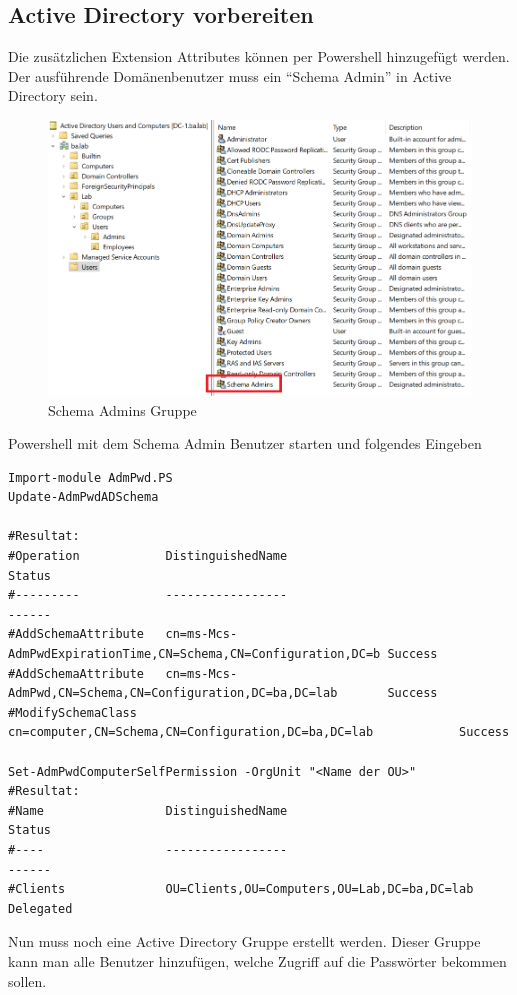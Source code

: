 \subsection{Active Directory vorbereiten}
Die zusätzlichen Extension Attributes können per Powershell hinzugefügt werden.
Der ausführende Domänenbenutzer muss ein ``Schema Admin'' in Active Directory sein.\\
\begin{figure}[H]
    \centering
    \includegraphics[width=0.7\linewidth]{../img/LAPS/schema-admins.png}
    \caption{Schema Admins Gruppe}
\end{figure}

Powershell mit dem Schema Admin Benutzer starten und folgendes Eingeben
\begin{lstlisting}
Import-module AdmPwd.PS
Update-AdmPwdADSchema

#Resultat:
#Operation            DistinguishedName                                              Status
#---------            -----------------                                              ------
#AddSchemaAttribute   cn=ms-Mcs-AdmPwdExpirationTime,CN=Schema,CN=Configuration,DC=b Success
#AddSchemaAttribute   cn=ms-Mcs-AdmPwd,CN=Schema,CN=Configuration,DC=ba,DC=lab       Success
#ModifySchemaClass    cn=computer,CN=Schema,CN=Configuration,DC=ba,DC=lab            Success

Set-AdmPwdComputerSelfPermission -OrgUnit "<Name der OU>"
#Resultat:
#Name                 DistinguishedName                                              Status
#----                 -----------------                                              ------
#Clients              OU=Clients,OU=Computers,OU=Lab,DC=ba,DC=lab                    Delegated
\end{lstlisting}

Nun muss noch eine Active Directory Gruppe erstellt werden.
Dieser Gruppe kann man alle Benutzer hinzufügen, welche Zugriff auf die Passwörter bekommen sollen.


